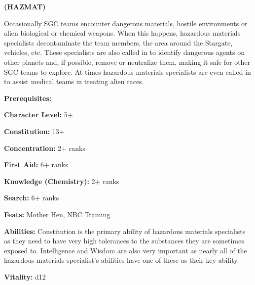  \textbf{(HAZMAT)}
\begin{multicols}{2}

Occasionally SGC teams encounter dangerous materials, hostile environments or alien biological or chemical weapons. When this happens, hazardous materials specialists decontaminate the team members, the area around the Stargate, vehicles, etc. These specialists are also called in to identify dangerous agents on other planets and, if possible, remove or neutralize them, making it safe for other SGC teams to explore. At times hazardous materials specialists are even called in to assist medical teams in treating alien races.

\columnbreak

\textbf{Prerequisites:} 
\begin{description*}
\item[\hspace{1.5cm}\textbf{Character Level:}] 5+
\item[\hspace{1.5cm}\textbf{Constitution:}] 13+
\item[\hspace{1.5cm}\textbf{Concentration:}] 2+ ranks
\item[\hspace{1.5cm}\textbf{First Aid:}] 6+ ranks
\item[\hspace{1.5cm}\textbf{Knowledge (Chemistry):}] 2+ ranks
\item[\hspace{1.5cm}\textbf{Search:}] 6+ ranks
\item[\hspace{1.5cm}\textbf{Feats:}] Mother Hen, NBC Training
\end{description*}

\textbf{Abilities:} Constitution is the primary ability of hazardous materials specialists as they need to have very high tolerances to the substances they are sometimes exposed to. Intelligence and Wisdom are also very important as nearly all of the hazardous materials specialist's abilities have one of these as their key ability.

\textbf{Vitality:} d12

\end{multicols}

\setlength{\intextsep}{-3cm}

